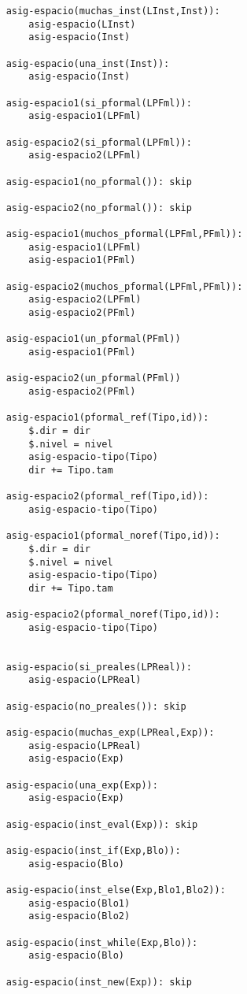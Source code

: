 \begin{lstlisting}
    asig-espacio(muchas_inst(LInst,Inst)):
        asig-espacio(LInst)
        asig-espacio(Inst)

    asig-espacio(una_inst(Inst)):
        asig-espacio(Inst)

    asig-espacio1(si_pformal(LPFml)):
        asig-espacio1(LPFml)

    asig-espacio2(si_pformal(LPFml)):
        asig-espacio2(LPFml)

    asig-espacio1(no_pformal()): skip

    asig-espacio2(no_pformal()): skip

    asig-espacio1(muchos_pformal(LPFml,PFml)):
        asig-espacio1(LPFml)
        asig-espacio1(PFml)

    asig-espacio2(muchos_pformal(LPFml,PFml)):
        asig-espacio2(LPFml)
        asig-espacio2(PFml)

    asig-espacio1(un_pformal(PFml))
        asig-espacio1(PFml)

    asig-espacio2(un_pformal(PFml))
        asig-espacio2(PFml)

    asig-espacio1(pformal_ref(Tipo,id)):
        $.dir = dir
        $.nivel = nivel
        asig-espacio-tipo(Tipo)
        dir += Tipo.tam

    asig-espacio2(pformal_ref(Tipo,id)):
        asig-espacio-tipo(Tipo)

    asig-espacio1(pformal_noref(Tipo,id)):
        $.dir = dir
        $.nivel = nivel
        asig-espacio-tipo(Tipo)
        dir += Tipo.tam

    asig-espacio2(pformal_noref(Tipo,id)):
        asig-espacio-tipo(Tipo)
        

    asig-espacio(si_preales(LPReal)):
        asig-espacio(LPReal)

    asig-espacio(no_preales()): skip

    asig-espacio(muchas_exp(LPReal,Exp)):
        asig-espacio(LPReal)
        asig-espacio(Exp)

    asig-espacio(una_exp(Exp)):
        asig-espacio(Exp)

    asig-espacio(inst_eval(Exp)): skip

    asig-espacio(inst_if(Exp,Blo)):
        asig-espacio(Blo)

    asig-espacio(inst_else(Exp,Blo1,Blo2)):
        asig-espacio(Blo1)
        asig-espacio(Blo2)

    asig-espacio(inst_while(Exp,Blo)):
        asig-espacio(Blo)

    asig-espacio(inst_new(Exp)): skip


\end{lstlisting}
